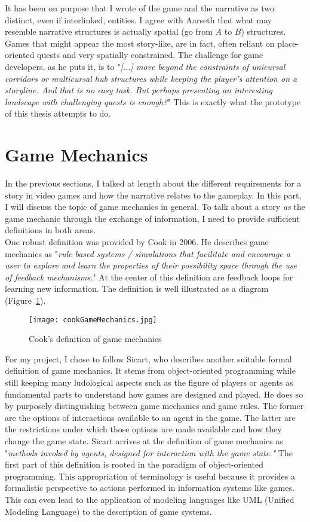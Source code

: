 It has been on purpose that I wrote of the game and the narrative as two distinct, even if interlinked, entities. I agree with Aarseth that what may resemble narrative structures is actually spatial (go from $A$ to $B$) structures. Games that might appear the most story-like, are in fact, often reliant on place-oriented quests and very spatially constrained. The challenge for game developers, as he puts it, is to "\textit{[...] move beyond the constraints of unicursal corridors or multicursal hub structures while keeping the player’s attention on a storyline. And that is no easy task. But perhaps presenting an interesting landscape with challenging quests is enough?}" This is exactly what the prototype of this thesis attempts to do.~\cite{Aarseth2005}
\section{Game Mechanics}
In the previous sections, I talked at length about the different requirements for a story in video games and how the narrative relates to the gameplay. In this part, I will discuss the topic of game mechanics in general. To talk about a story \textit{as} the game mechanic through the exchange of information, I need to provide sufficient definitions in both areas.\\
One robust definition was provided by Cook in 2006. He describes game mechanics as "\textit{rule based systems / simulations that facilitate and encourage a user to explore and learn the properties of their possibility space through the use of feedback mechanisms.}" At the center of this definition are feedback loops for learning new information. The definition is well illustrated as a diagram (Figure~\ref{fig:cookGameMechanics}).~\cite{Cook2006}
\begin{figure}
	\centering
	\texttt{[image: cookGameMechanics.jpg]}
	\caption{Cook's definition of game mechanics~\cite{Cook2006}}
	\label{fig:cookGameMechanics}
\end{figure}
For my project, I chose to follow Sicart, who describes another suitable formal definition of game mechanics. It stems from object-oriented programming while still keeping many ludological aspects such as the figure of players or agents as fundamental parts to understand how games are designed and played. He does so by purposely distinguishing between game mechanics and game rules. The former are the options of interactions available to an agent in the game. The latter are the restrictions under which those options are made available and how they change the game state. Sicart arrives at the definition of game mechanics as "\textit{methods invoked by agents, designed for interaction with the game state."} The first part of this definition is rooted in the paradigm of object-oriented programming. This appropriation of terminology is useful because it provides a formalistic perspective to actions performed in information systems like games. This can even lead to the application of modeling languages like UML (Unified Modeling Language) to the description of game systems.~\cite{Sicart2008}\\
